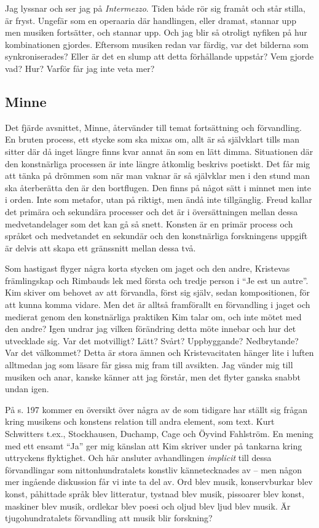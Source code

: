 \documentclass[a4paper]{article}
\begin{document}
Jag lyssnar och ser jag på \emph{Intermezzo}. Tiden både rör sig framåt och står stilla, är fryst. Ungefär som en operaaria där handlingen, eller dramat, stannar upp men musiken fortsätter, och stannar upp. Och jag blir så otroligt nyfiken på hur kombinationen gjordes. Eftersom musiken redan var färdig, var det bilderna som synkroniserades? Eller är det en slump att detta förhållande uppstår? Vem gjorde vad? Hur? Varför får jag inte veta mer?

\subsection*{Minne}

Det fjärde avsnittet, Minne, återvänder till temat fortsättning och förvandling. En bruten process, ett stycke som ska mixas om, allt är så självklart tills man sitter där då inget längre finns kvar annat än som en lätt dimma. Situationen där den konstnärliga processen är inte längre åtkomlig beskrivs poetiskt. Det får mig att tänka på drömmen som när man vaknar är så självklar men i den stund man ska återberätta den är den bortflugen. Den finns på något sätt i minnet men inte i orden. Inte som metafor, utan på riktigt, men ändå inte tillgänglig. Freud kallar det primära och sekundära processer och det är i översättningen mellan dessa medvetandelager som det kan gå så snett. Konsten är en primär process och språket och medvetandet en sekundär och den konstnärliga forskningens uppgift är delvis att skapa ett gränssnitt mellan dessa två.

Som hastigast flyger några korta stycken om jaget och den andre, Kristevas främlingskap och Rimbauds lek med första och tredje person i ``Je est un autre''. Kim skiver om behovet av att förvandla, först sig själv, sedan kompositionen, för att kunna komma vidare. Men det är alltså framförallt en förvandling i jaget och medierat genom den konstnärliga praktiken Kim talar om, och inte mötet med den andre? Igen undrar jag vilken förändring detta möte innebar och hur det utvecklade sig. Var det motvilligt? Lätt? Svårt? Uppbyggande? Nedbrytande? Var det välkommet? Detta är stora ämnen och Kristevacitaten hänger lite i luften alltmedan jag som läsare får gissa mig fram till avsikten. Jag vänder mig till musiken och anar, kanske känner att jag förstår, men det flyter ganska snabbt undan igen. 

På s. 197 kommer en översikt över några av de som tidigare har ställt sig frågan kring musikens och konstens relation till andra element, som text. Kurt Schwitters t.ex., Stockhausen, Duchamp, Cage och Öyvind Fahlström. En mening med ett ensamt ``Ja'' ger mig känslan att Kim skriver under på tankarna kring uttryckens flyktighet. Och här ansluter avhandlingen \emph{implicit} till dessa förvandlingar som nittonhundratalets konstliv kännetecknades av -- men någon mer ingående diskussion får vi inte ta del av. Ord blev musik, konservburkar blev konst, påhittade språk blev litteratur, tystnad blev musik, pissoarer blev konst, maskiner blev musik, ordlekar blev poesi och oljud blev ljud blev musik. Är tjugohundratalets förvandling att musik blir forskning? 
\end{document}
